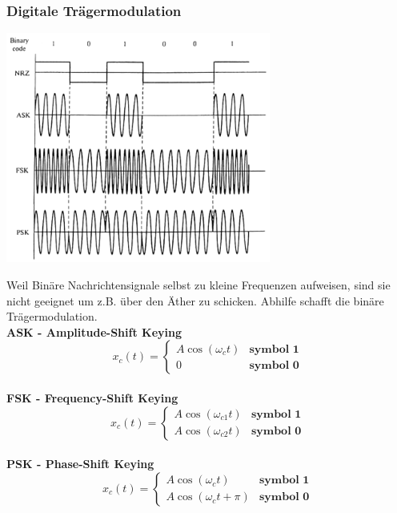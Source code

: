 \subsubsection{Digitale Trägermodulation }
\begin{minipage}{9cm}
	\includegraphics[width=8.7cm]{bilder/dig_traegermodulation.png}
\end{minipage}
\begin{minipage}{9cm}
	Weil Binäre Nachrichtensignale selbst zu kleine Frequenzen aufweisen, sind sie nicht geeignet um
	z.B. über den Äther zu schicken. Abhilfe schafft die binäre Trägermodulation. 
	\vspace{1cm}  \\
	\textbf{ASK - Amplitude-Shift Keying} \\
	$$x_c(t) = \begin{cases}
           A \cos(\omega_c t) & \textbf{symbol 1} \\
           0 & \textbf{symbol 0}
           \end{cases} $$ \\
	\textbf{FSK - Frequency-Shift Keying} \\
	$$x_c(t) = \begin{cases}
           A \cos(\omega_{c1} t) & \textbf{symbol 1}     \\         
           A \cos(\omega_{c2} t) & \textbf{symbol 0}
           \end{cases} $$ \\
	\textbf{PSK - Phase-Shift Keying} \\
	$$x_c(t) = \begin{cases}
           A \cos(\omega_{c} t) & \textbf{symbol 1}        \\      
           A \cos(\omega_{c} t + \pi) & \textbf{symbol 0}
           \end{cases} $$ \\
\end{minipage}

